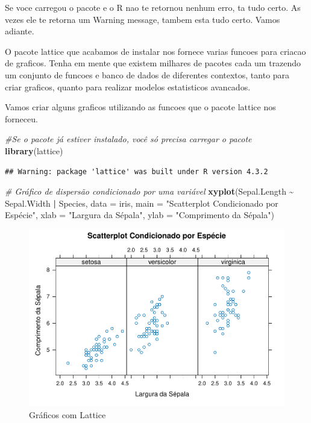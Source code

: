\documentclass[
]{book}
\newenvironment{Shaded}{\begin{snugshade}}{\end{snugshade}}
\newcommand{\AttributeTok}[1]{\textcolor[rgb]{0.13,0.29,0.53}{#1}}
\newcommand{\CommentTok}[1]{\textcolor[rgb]{0.56,0.35,0.01}{\textit{#1}}}
\newcommand{\FunctionTok}[1]{\textcolor[rgb]{0.13,0.29,0.53}{\textbf{#1}}}
\newcommand{\NormalTok}[1]{#1}
\newcommand{\SpecialCharTok}[1]{\textcolor[rgb]{0.81,0.36,0.00}{\textbf{#1}}}
\newcommand{\StringTok}[1]{\textcolor[rgb]{0.31,0.60,0.02}{#1}}
\begin{document}
Se voce carregou o pacote e o R nao te retornou nenhum erro, ta tudo certo. As vezes ele te retorna um Warning message, tambem esta tudo certo. Vamos adiante.

O pacote lattice que acabamos de instalar nos fornece varias funcoes para criacao de graficos. Tenha em mente que existem milhares de pacotes cada um trazendo um conjunto de funcoes e banco de dados de diferentes contextos, tanto para criar graficos, quanto para realizar modelos estatisticos avancados.

Vamos criar alguns graficos utilizando as funcoes que o pacote lattice nos forneceu.

\begin{Shaded}
\begin{Highlighting}[]
\CommentTok{\#Se o pacote já estiver instalado, você só precisa carregar o pacote}
\FunctionTok{library}\NormalTok{(lattice) }
\end{Highlighting}
\end{Shaded}

\begin{verbatim}
## Warning: package 'lattice' was built under R version 4.3.2
\end{verbatim}

\begin{Shaded}
\begin{Highlighting}[]
\CommentTok{\# Gráfico de dispersão condicionado por uma variável}
\FunctionTok{xyplot}\NormalTok{(Sepal.Length }\SpecialCharTok{\textasciitilde{}}\NormalTok{ Sepal.Width }\SpecialCharTok{|}\NormalTok{ Species, }\AttributeTok{data =}\NormalTok{ iris,}
       \AttributeTok{main =} \StringTok{"Scatterplot Condicionado por Espécie"}\NormalTok{,}
       \AttributeTok{xlab =} \StringTok{"Largura da Sépala"}\NormalTok{, }
       \AttributeTok{ylab =} \StringTok{"Comprimento da Sépala"}\NormalTok{)}
\end{Highlighting}
\end{Shaded}

\begin{figure}
\centering
\includegraphics{_main_files/figure-latex/nome-do-chunk-1.pdf}
\caption{\label{fig:nome-do-chunk-1}Gráficos com Lattice}
\end{figure}
\end{document}
